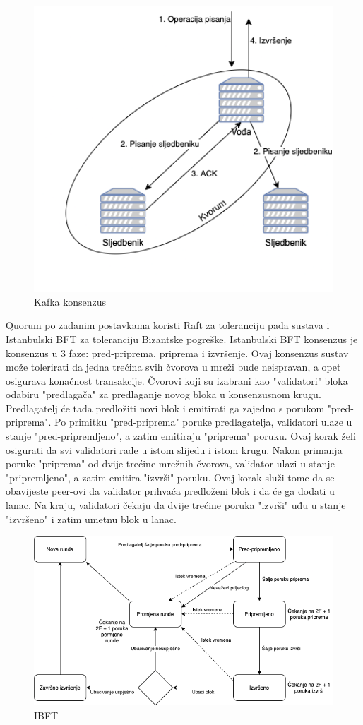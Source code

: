 \documentclass[times, utf8, diplomski]{fer}
\begin{document}
\begin{figure}[htb]
\centering
\includegraphics[width=12cm]{imgs/Kafka.png}
\caption{Kafka konsenzus}
\label{fig:kafka}
\end{figure}

Quorum po zadanim postavkama koristi Raft za toleranciju pada sustava i Istanbulski BFT za toleranciju Bizantske pogreške. Istanbulski BFT konsenzus je konsenzus u 3 faze: pred-priprema, priprema i izvršenje. Ovaj konsenzus sustav može tolerirati da jedna trećina svih čvorova u mreži bude neispravan, a opet osigurava konačnost transakcije. Čvorovi koji su izabrani kao "validatori" bloka odabiru "predlagača" za predlaganje novog bloka u konsenzusnom krugu. Predlagatelj će tada predložiti novi blok i emitirati ga zajedno s porukom "pred-priprema". Po primitku "pred-priprema" poruke predlagatelja, validatori ulaze u stanje "pred-pripremljeno", a zatim emitiraju "priprema" poruku. Ovaj korak želi osigurati da svi validatori rade u istom slijedu i istom krugu. Nakon primanja poruke "priprema" od dvije trećine mrežnih čvorova, validator ulazi u stanje "pripremljeno", a zatim emitira "izvrši" poruku. Ovaj korak služi tome da se obavijeste peer-ovi da validator prihvaća predloženi blok i da će ga dodati u lanac. Na kraju, validatori čekaju da dvije trećine poruka "izvrši" uđu u stanje "izvršeno" i zatim umetnu blok u lanac.

\begin{figure}[htb]
\centering
\includegraphics[width=12cm]{imgs/IBFT.png}
\caption{IBFT}
\label{fig:ibft}
\end{figure}
\end{document}
